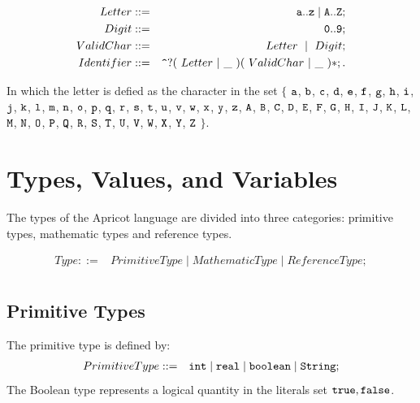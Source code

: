 \documentclass{WileySix}
\begin{document}
\begin{eqnarray*}
 Letter  &::=& {\tt a .. z \mid A .. Z} ;\\
 Digit  &::=& {\tt 0 .. 9};\\
 ValidChar  &::=&  Letter   ~\mid~  Digit ;\\
 Identifier  &::=& {\tt \verb!^!} ? (~Letter~|~{\tt \_}~) (~ValidChar~|~{\tt \_}~)*;.
\end{eqnarray*}


In which the letter is defied as the character in the set 
$\{$  ${\tt a}$, 
${\tt b}$, ${\tt c}$, ${\tt d}$, 
${\tt e}$, ${\tt f}$, ${\tt g}$, ${\tt h}$, 
${\tt i}$, ${\tt j}$, ${\tt k}$, ${\tt l}$, ${\tt m}$, 
${\tt n}$, ${\tt o}$, ${\tt p}$, ${\tt q}$, ${\tt r}$, 
${\tt s}$, ${\tt t}$, ${\tt u}$, ${\tt v}$, ${\tt w}$, 
${\tt x}$, ${\tt y}$, ${\tt z}$, ${\tt A}$, ${\tt B}$, 
${\tt C}$, ${\tt D}$, ${\tt E}$, ${\tt F}$, ${\tt G}$, 
${\tt H}$, ${\tt I}$, ${\tt J}$, ${\tt K}$, ${\tt L}$, 
${\tt M}$, ${\tt N}$, ${\tt O}$, ${\tt P}$, ${\tt Q}$, 
${\tt R}$, ${\tt S}$, ${\tt T}$, ${\tt U}$, ${\tt V}$, 
${\tt W}$, ${\tt X}$, ${\tt Y}$, ${\tt Z}$
$\}$.


\section{Types, Values, and Variables}
The types of the Apricot  language are divided into three categories: primitive types,
mathematic types and reference types. 

\begin{align*}
 Type ::= & PrimitiveType \mid MathematicType  \mid  ReferenceType ;\\
\end{align*}

\subsection{Primitive Types}


The primitive type is defined by:
\begin{eqnarray*}
 PrimitiveType &::=&  {\tt int} \mid {\tt real} \mid {\tt boolean} \mid {\tt String};\\
\end{eqnarray*}
The Boolean
type represents a logical quantity in the literals set $\\{ {\tt true}, {\tt false}\\}$.
\end{document}
